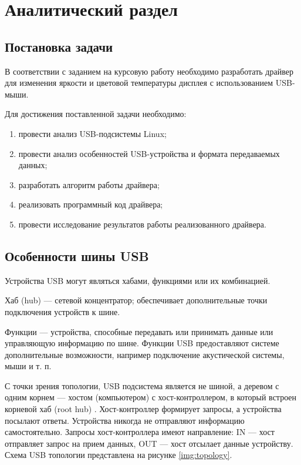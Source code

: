\section{Аналитический раздел}

\subsection{Постановка задачи}

В соответствии с заданием на курсовую работу необходимо разработать драйвер для изменения яркости и цветовой температуры дисплея с использованием USB-мыши.

Для достижения поставленной задачи необходимо:

\begin{enumerate}
	\item провести анализ USB-подсистемы Linux;
	\item провести анализ особенностей USB-устройства и формата передаваемых данных;
	\item разработать алгоритм работы драйвера;
	\item реализовать программный код драйвера;
	\item провести исследование результатов работы реализованного драйвера.
\end{enumerate}

\subsection{Особенности шины USB}

Устройства USB могут являться хабами, функциями или их комбинацией.

Хаб (hub) --- сетевой концентратор; обеспечивает дополнительные точки подключения устройств к шине.

Функции --- устройства, способные передавать или принимать данные или управляющую информацию по шине.
Функции USB предоставляют системе дополнительные возможности, например подключение акустической системы, мыши и т. п.

С точки зрения топологии, USB подсистема является не шиной, а деревом с одним корнем --- хостом (компьютером) с хост-контроллером, в который встроен корневой хаб (root hub) \cite{corbet2005linux}.
Хост-контроллер формирует запросы, а устройства посылают ответы.
Устройства никогда не отправляют информацию самостоятельно.
Запросы хост-контроллера имеют направление: IN --- хост отправляет запрос на прием данных, OUT --- хост отсылает данные устройству.
Схема USB топологии представлена на рисунке \ref{img:topology}.

